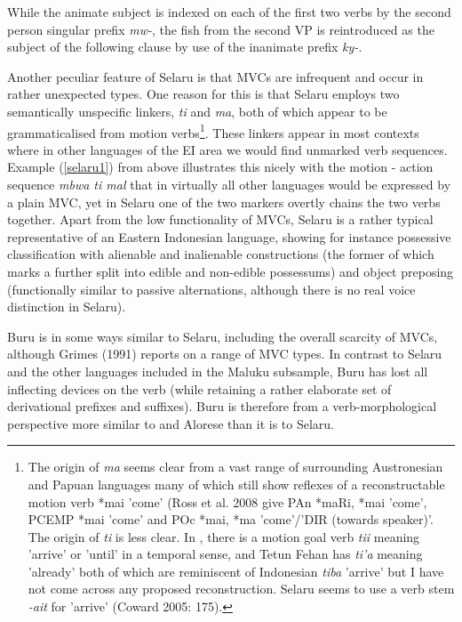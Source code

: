 While the animate subject is indexed on each of the first two verbs by the second person singular prefix \textit{mw-}, the fish from the second VP is reintroduced as the subject of the following clause by use of the inanimate prefix \textit{ky-}. 

Another peculiar feature of Selaru is that MVCs are infrequent and occur in rather unexpected types. One reason for this is that Selaru employs two semantically unspecific linkers, \textit{ti} and \textit{ma}, both of which appear to be grammaticalised from motion verbs\footnote{The origin of \textit{ma} seems clear from a vast range of surrounding Austronesian and Papuan languages many of which still show reflexes of a reconstructable motion verb *mai 'come' (Ross et al. 2008 give PAn *maRi, *mai 'come', PCEMP *mai 'come' and POc *mai, *ma 'come'/'DIR (towards speaker)'. The origin of \textit{ti} is less clear. In , there is a motion goal verb \textit{tii} meaning 'arrive' or 'until' in a temporal sense, and Tetun Fehan has \textit{ti'a} meaning 'already' both of which are reminiscent of Indonesian \textit{tiba} 'arrive' but I have not come across any proposed reconstruction. Selaru seems to use a verb stem \textit{-ait} for 'arrive' (Coward 2005: 175).}. These linkers appear in most contexts where in other languages of the EI area we would find unmarked verb sequences. Example (\ref{selaru1}) from above illustrates this nicely with the motion - action sequence \textit{mbwa ti mal} that in virtually all other languages would be expressed by a plain MVC, yet in Selaru one of the two markers overtly chains the two verbs together. Apart from the low functionality of MVCs, Selaru is a rather typical representative of an Eastern Indonesian language, showing for instance possessive classification with alienable and inalienable constructions (the former of which marks a further split into edible and non-edible possessums) and object preposing (functionally similar to passive alternations, although there is no real voice distinction in Selaru). 

Buru is in some ways similar to Selaru, including the overall scarcity of MVCs, although Grimes (1991) reports on a range of MVC types. In contrast to Selaru and the other languages included in the Maluku subsample, Buru has lost all inflecting devices on the verb (while retaining a rather elaborate set of derivational prefixes and suffixes). Buru is therefore from a verb-morphological perspective more similar to  and Alorese than it is to Selaru.


